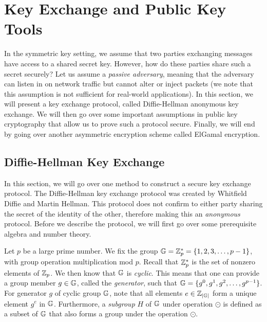 \section{Key Exchange and Public Key Tools}
\label{sec:pke2}

In the symmetric key setting, we assume that two parties exchanging messages have access to a shared secret key. However, how do these parties share such a secret securely? Let us assume a \textit{passive adversary}, meaning that the adversary can listen in on network traffic but cannot alter or inject packets (we note that this assumption is not sufficient for real-world applications). In this section, we will present a key exchange protocol, called Diffie-Hellman anonymous key exchange. We will then go over some important assumptions in public key cryptography that allow us to prove such a protocol secure. Finally, we will end by going over another asymmetric encryption scheme called ElGamal encryption. 

\subsection{Diffie-Hellman Key Exchange}

In this section, we will go over one method to construct a secure key exchange protocol. The Diffie-Hellman key exchange protocol was created by Whitfield Diffie and Martin Hellman. This protocol does not confirm to either party sharing the secret of the identity of the other, therefore making this an \textit{anonymous} protocol. Before we describe the protocol, we will first go over some prerequisite algebra and number theory.

Let $p$ be a large prime number. We fix the group $\mathbb{G} = {{\mathbb Z}}_p^*=\{1,2,3,\ldots,p-1\}$, with group operation multiplication mod $p$. Recall that ${{\mathbb Z}}_p^*$ is the set of nonzero elements of ${{\mathbb Z}}_p$. We then know that $\mathbb{G}$ is \textit{cyclic}. This means that one can provide a group member $g \in \mathbb{G}$, called the \textit{generator}, such that $\mathbb{G} = \{g^0, g^1, g^2, \ldots, g^{p-1}\}$. For generator $g$ of cyclic group $\mathbb{G}$, note that all elements $e\in{{\mathbb Z}}_{|\mathbb{G}|}$ form a unique element $g^e$ in $\mathbb{G}$. Furthermore, a \textit{subgroup} $H$ of $\mathbb{G}$ under operation $\odot$ is defined as a subset of $\mathbb{G}$ that also forms a group under the operation $\odot$. 

